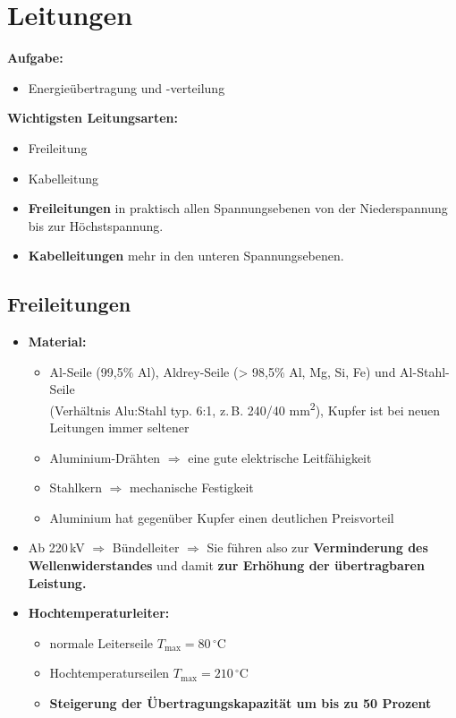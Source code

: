 \newcolumn
\section{Leitungen}

\textbf{Aufgabe:}
\begin{itemize}
    \item  Energieübertragung und -verteilung\\
\end{itemize}

\textbf{Wichtigsten Leitungsarten:}
\begin{itemize}
    \item Freileitung
    \item Kabelleitung
    \item \textbf{Freileitungen} in praktisch allen Spannungsebenen von der Niederspannung bis zur Höchstspannung.
    \item \textbf{Kabelleitungen} mehr in den unteren Spannungsebenen.
\end{itemize}


\subsection{Freileitungen}

\begin{itemize}
    \item \textbf{Material:}
    \begin{itemize}
        \item Al-Seile (99{,}5\% Al), Aldrey-Seile (> 98{,}5\% Al, Mg, Si, Fe) und Al-Stahl-Seile\\ 
        (Verhältnis Alu:Stahl typ. 6:1, z.\,B. 240/40 mm\textsuperscript{2}), Kupfer ist bei neuen Leitungen immer seltener
        \item Aluminium-Drähten $\Rightarrow$ eine gute elektrische Leitfähigkeit
        \item Stahlkern $\Rightarrow$ mechanische Festigkeit
        \item Aluminium hat gegenüber Kupfer einen deutlichen Preisvorteil
    \end{itemize}

    \item Ab 220\,kV $\Rightarrow$ Bündelleiter $\Rightarrow$ Sie führen also zur 
    \textbf{Verminderung des Wellenwiderstandes} und damit 
    \textbf{zur Erhöhung der übertragbaren Leistung.}

    \item \textbf{Hochtemperaturleiter:}
    \begin{itemize}
        \item normale Leiterseile $T_{\text{max}} = 80\,^{\circ}\mathrm{C}$
        \item Hochtemperaturseilen $T_{\text{max}} = 210\,^{\circ}\mathrm{C}$
        \item \textbf{Steigerung der Übertragungskapazität um bis zu 50 Prozent}
    \end{itemize}
\end{itemize}


